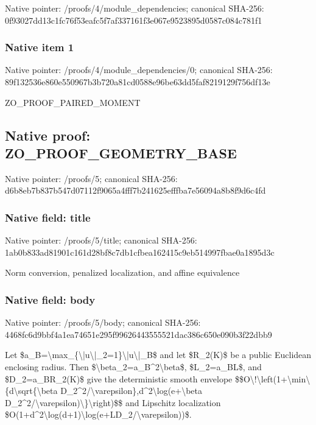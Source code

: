 \documentclass[10pt,a4paper]{article}
\begin{document}
Native pointer: /proofs/4/module\_dependencies; canonical SHA-256: 0f93027dd13c1fc76f53eafc\allowbreak{}5f7af337161f3e067e952389\allowbreak{}5d0587c084c781f1



\subsubsection{Native item 1}


Native pointer: /proofs/4/module\_dependencies/0; canonical SHA-256: 89f132536e860e550967b3b7\allowbreak{}20a81cd0588e96be63dd5faf\allowbreak{}8219129f756df13e


ZO\_PROOF\_PAIRED\_MOMENT


\subsection{Native proof: ZO\_PROOF\_GEOMETRY\_BASE}


Native pointer: /proofs/5; canonical SHA-256: d6b8eb7b837b547d07112f90\allowbreak{}65a4fff7b241625efffba7e5\allowbreak{}6094a8b8f9d6c4fd



\subsubsection{Native field: title}


Native pointer: /proofs/5/title; canonical SHA-256: 1ab0b833ad81901c161d28bf\allowbreak{}8c7db1cfbea162415c9eb514\allowbreak{}997fbae0a1895d3c


Norm conversion, penalized localization, and affine equivalence


\subsubsection{Native field: body}


Native pointer: /proofs/5/body; canonical SHA-256: 4468fc6d9bbf4a1ea74651e2\allowbreak{}95f99626443555521dac386c\allowbreak{}650e090b3f22dbb9


Let \$a\_B=\textbackslash{}max\_\{\textbackslash{}|u\textbackslash{}|\_2=1\}\textbackslash{}|u\textbackslash{}|\_B\$ and let \$R\_2(K)\$ be a public Euclidean enclosing radius. Then \$\textbackslash{}beta\_2=a\_B\textasciicircum{}2\textbackslash{}beta\$, \$L\_2=a\_BL\$, and \$D\_2=a\_BR\_2(K)\$ give the deterministic smooth envelope
\$\$O\textbackslash{}!\textbackslash{}left(1+\textbackslash{}min\textbackslash{}\{d\textbackslash{}sqrt\{\textbackslash{}beta D\_2\textasciicircum{}2/\textbackslash{}varepsilon\},d\textasciicircum{}2\textbackslash{}log(e+\textbackslash{}beta D\_2\textasciicircum{}2/\textbackslash{}varepsilon)\textbackslash{}\}\textbackslash{}right)\$\$
and Lipschitz localization \$O(1+d\textasciicircum{}2\textbackslash{}log(d+1)\textbackslash{}log(e+\allowbreak{}LD\_2/\textbackslash{}varepsilon))\$.
\end{document}
